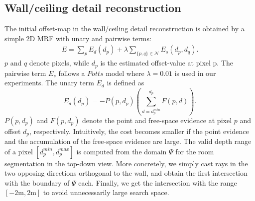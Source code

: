 \subsection{Wall/ceiling detail reconstruction}



The initial offset-map in the wall/ceiling detail reconstruction is
obtained by a simple 2D MRF with unary and pairwise terms:
\begin{eqnarray*}
 E = \sum_p E_d(d_p) + \lambda \sum_{\{p,q\} \in \mathcal{N}} E_s(d_p, d_q).
\end{eqnarray*}
$p$ and $q$ denote pixels, while $d_p$ is the estimated offset-value at
pixel p.  The pairwise term $E_s$ follows a $Potts$ model where $\lambda
= 0.01$ is used in our experiments. The unary term $E_d$ is defined
as
\begin{equation*}
E_d(d_p) = -P(p, d_p)\left(\sum_{d=d_p^{min}}^{d_p} F(p, d)\right). \label{eq:costdetail}
\end{equation*}
$P(p, d_p)$ and $F(p, d_p)$ denote the point and free-space evidence at
pixel $p$ and offset $d_p$, respectively. Intuitively, the cost becomes
smaller if the point evidence and the accumulation of the free-space
evidence are large. The valid depth range of a pixel $[d_p^{min},
d_p^{max}]$ is computed from the domain $\Psi$ for the room segmentation
in the top-down view. More concretely, we simply cast rays in the two
opposing directions orthogonal to the wall, and obtain the first
intersection with the boundary of $\Psi$ each. Finally, we get the
intersection with the range $[-2\mbox{m}, 2\mbox{m}]$ to avoid unnecessarily large
search space.




